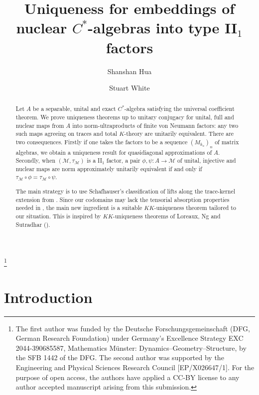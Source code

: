 \documentclass[reqno]{amsart}
\theoremstyle{definition}
\theoremstyle{remark}
\numberwithin{equation}{section}
\theoremstyle{definition}
\newcommand{\calM}{\mathcal{M}}
\begin{document}
  
\title{Uniqueness for embeddings of nuclear $C^*$-algebras into type II$_{1}$ factors}  
\author{Shanshan Hua}
\address{Mathematisches Institut, Fachbereich Mathematik und
Informatik der Universität Münster, Einsteinstrasse 62, 48149 Münster, Germany.} 
\author{Stuart White} 
\address{Mathematical Institute, University of Oxford, Andrew Wiles Building, Radcliffe Observatory Quarter, Woodstock Road, Oxford, OX2 6GG, United Kingdom}
\thanks{The first author was funded by the Deutsche Forschungsgemeinschaft (DFG, German Research Foundation) under Germany’s Excellence Strategy EXC 2044-390685587, Mathematics Münster: Dynamics–Geometry–Structure, by the SFB 1442 of the DFG. The second author was supported by the Engineering and Physical Sciences Research Council [EP/X026647/1]. For the purpose of open access, the authors have applied a CC-BY license to any author accepted manuscript arising from this submission. } 
\maketitle 

\begin{abstract} 
     Let $A$ be a separable, unital and exact $C^*$-algebra satisfying the universal coefficient theorem. We prove uniqueness theorems up to unitary conjugacy for unital, full and nuclear maps from $A$ into norm-ultraproducts of finite von Neumann factors: any two such maps agreeing on traces and total $K$-theory are unitarily equivalent. There are two consequences. Firstly if one takes the factors to be a sequence $(M_{k_n})_{n}$ of matrix algebras, we obtain a uniqueness result for quasidiagonal approximations of $A$. Secondly, when $(\mathcal M,\tau_{\calM})$ is a II$_1$ factor, a pair  $\phi,\psi:A\to\mathcal M$ of unital, injective and nuclear maps are norm approximately unitarily equivalent if and only if $\tau_{\calM}\circ\phi=\tau_{\calM}\circ\psi$.

     The main strategy is to use Schafhauser's classification of lifts along the trace-kernel extension from \cite{Schafhauser.Annals}.  Since our codomains may lack the tensorial absorption properties needed in \cite{Schafhauser.Annals}, the main new ingredient is a suitable $KK$-uniqueness theorem tailored to our situation. This is inspired by $KK$-uniqueness theorems of Loreaux, Ng and Sutradhar (\cite{ess-codim}).
\end{abstract} 

\section*{Introduction}
\end{document}

